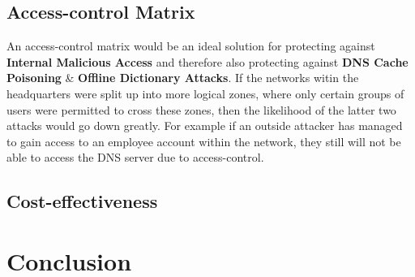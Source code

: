 \documentclass[11pt]{article}
\begin{document}
      \subsection{Access-control Matrix}
        An access-control matrix would be an ideal solution for protecting against \textbf{Internal Malicious Access} and therefore also protecting against \textbf{DNS Cache Poisoning} \& \textbf{Offline Dictionary Attacks}. If the networks witin the headquarters were split up into more logical zones, where only certain groups of users were permitted to cross these zones, then the likelihood of the latter two attacks would go down greatly. For example if an outside attacker has managed to gain access to an employee account within the network, they still will not be able to access the DNS server due to access-control.

      \subsection{Cost-effectiveness}

    \section{Conclusion}

  \newpage

  
  
\end{document}
